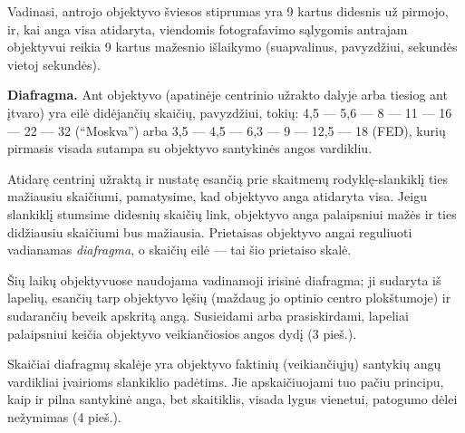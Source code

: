 \documentclass{book}
\begin{document}
					Vadinasi, antrojo objektyvo šviesos stiprumas yra 9 kartus didesnis už pirmojo, ir, kai anga visa atidaryta, viendomis fotografavimo sąlygomis antrajam objektyvui reikia 9 kartus mažesnio išlaikymo (suapvalinus, pavyzdžiui,  sekundės vietoj  sekundės).

					\textbf{Diafragma.} Ant objektyvo (apatinėje centrinio užrakto dalyje arba tiesiog ant įtvaro) yra eilė didėjančių skaičių, pavyzdžiui, tokių: 4,5 --- 5,6 --- 8 --- 11 --- 16 --- 22 --- 32 (``Moskva'') arba 3,5 --- 4,5 --- 6,3 --- 9 --- 12,5 --- 18 (FED), kurių pirmasis visada sutampa su objektyvo santykinės angos vardikliu.

					Atidarę centrinį užraktą ir nustatę esančią prie skaitmenų rodyklę-slankiklį ties mažiausiu skaičiumi, pamatysime, kad objektyvo anga atidaryta visa. Jeigu slankiklį stumsime didesnių skaičių link, objektyvo anga palaipsniui mažės ir ties didžiausiu skaičiumi bus mažiausia. Prietaisas objektyvo angai reguliuoti vadianamas \textit{diafragma}, o skaičių eilė --- tai šio prietaiso skalė.

					Šių laikų objektyvuose naudojama vadinamoji irisinė diafragma; ji sudaryta iš lapelių, esančių tarp objektyvo lęšių (maždaug jo optinio centro plokštumoje) ir sudarančių beveik apskritą angą. Susieidami arba prasiskirdami, lapeliai palaipsniui keičia objektyvo veikiančiosios angos dydį (3 pieš.).

					Skaičiai diafragmų skalėje yra objektyvo faktinių (veikiančiųjų) santykių angų vardikliai įvairioms slankiklio padėtims. Jie apskaičiuojami tuo pačiu principu, kaip ir pilna santykinė anga, bet skaitiklis, visada lygus vienetui, patogumo dėlei nežymimas (4 pieš.).
\end{document}
